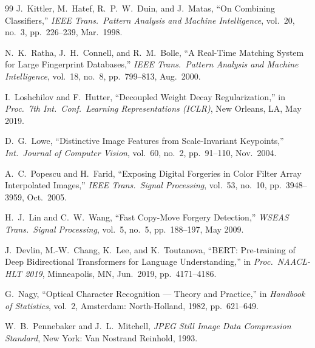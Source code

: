 \documentclass[12pt,a4paper,oneside]{report}
\begin{document}
\begin{thebibliography}{99}
J.~Kittler, M.~Hatef, R.~P.~W.~Duin, and J.~Matas,
``On Combining Classifiers,''
\textit{IEEE Trans.\ Pattern Analysis and Machine Intelligence},
vol.~20, no.~3, pp.~226--239, Mar.\ 1998.
 
N.~K.~Ratha, J.~H.~Connell, and R.~M.~Bolle,
``A Real-Time Matching System for Large Fingerprint Databases,''
\textit{IEEE Trans.\ Pattern Analysis and Machine Intelligence},
vol.~18, no.~8, pp.~799--813, Aug.\ 2000.
 
I.~Loshchilov and F.~Hutter,
``Decoupled Weight Decay Regularization,''
in \textit{Proc.\ 7th Int.\ Conf.\ Learning Representations (ICLR)},
New Orleans, LA, May 2019.
 
D.~G.~Lowe,
``Distinctive Image Features from Scale-Invariant Keypoints,''
\textit{Int.\ Journal of Computer Vision},
vol.~60, no.~2, pp.~91--110, Nov.\ 2004.
 
A.~C.~Popescu and H.~Farid,
``Exposing Digital Forgeries in Color Filter Array Interpolated Images,''
\textit{IEEE Trans.\ Signal Processing},
vol.~53, no.~10, pp.~3948--3959, Oct.\ 2005.
 
H.~J.~Lin and C.~W.~Wang,
``Fast Copy-Move Forgery Detection,''
\textit{WSEAS Trans.\ Signal Processing}, vol.~5, no.~5, pp.~188--197, May 2009.
 
J.~Devlin, M.-W.~Chang, K.~Lee, and K.~Toutanova,
``BERT: Pre-training of Deep Bidirectional Transformers for Language Understanding,''
in \textit{Proc.\ NAACL-HLT 2019}, Minneapolis, MN, Jun.\ 2019, pp.~4171--4186.
 
G.~Nagy,
``Optical Character Recognition --- Theory and Practice,''
in \textit{Handbook of Statistics}, vol.~2,
Amsterdam: North-Holland, 1982, pp.~621--649.
 
W.~B.~Pennebaker and J.~L.~Mitchell,
\textit{JPEG Still Image Data Compression Standard},
New York: Van Nostrand Reinhold, 1993.
 
\end{thebibliography}
\end{document}
